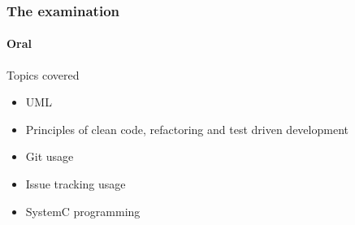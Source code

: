 \begin{frame}
\frametitle{The examination}
\framesubtitle{Oral}

\begin{block}{Topics covered}
\begin{itemize}
\item UML
\item Principles of clean code, refactoring and test driven development
\item Git usage
\item Issue tracking usage
\item SystemC programming
\end{itemize}
\end{block}

\end{frame}